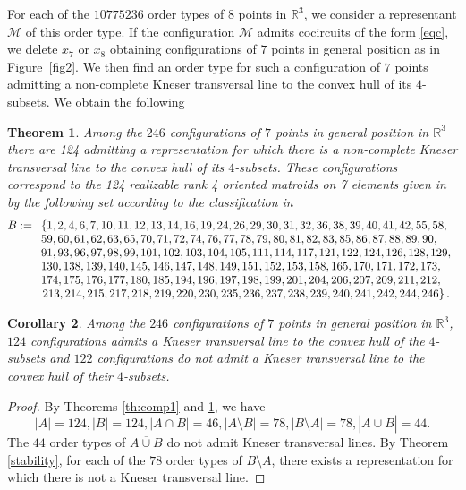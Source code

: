 \documentclass[11pt]{amsart}
\theoremstyle{plain}
\newtheorem{theorem}{Theorem}[section]
\newtheorem{corollary}[theorem]{Corollary}
\theoremstyle{definition}
\theoremstyle{remark}
\begin{document}
For each of the $10775236$ order types of $8$ points in ${\mathbb{R}}^3$, we consider a representant $\mathcal{M}$ of this order type. If the configuration $\mathcal{M}$ admits cocircuits of the form \eqref{eqc}, we delete $x_7$ or $x_8$ obtaining configurations of $7$ points in general position as in Figure~\ref{fig2}. We then find an order type for such a configuration of $7$ points admitting a non-complete Kneser transversal line to the convex hull of its $4$-subsets. We obtain the following

\begin{theorem}\label{th:comp2}
Among the $246$ configurations of $7$ points in general position in ${\mathbb{R}}^3$ there are 124  admitting a representation for which there is a non-complete Kneser transversal line to the convex hull of its $4$-subsets. These configurations correspond to the 124 realizable rank 4 oriented matroids on 7 elements given in by the following set according to the classification in \cite{F}
{\scriptsize $$
B :=
\begin{array}[t]{l}
\left\{1,2,4,6,7,10,11,12,13,14,16,19,24,26,29,30,31,32,36,38,39,40,41,42,55,58,\right.\\
59,60,61,62,63,65,70,71,72,74,76,77,78,79,80,81,82,83,85,86,87,88,89,90,\\
91,93,96,97,98,99,101,102,103,104,105,111,114,117,121,122,124,126,128,129,\\
130,138,139,140,145,146,147,148,149,151,152,153,158,165,170,171,172,173,\\
174,175,176,177,180,185,194,196,197,198,199,201,204,206,207,209,211,212,\\
\left. 213,214,215,217,218,219,220,230,235,236,237,238,239,240,241,242,244,246\right\}.
\end{array}
$$}
\end{theorem}

\begin{corollary}
Among the $246$ configurations of $7$ points in general position in ${\mathbb{R}}^3$, $124$ configurations admits a Kneser transversal line to the convex hull of the $4$-subsets 
and $122$ configurations do not admit a Kneser transversal line to the convex hull of their $4$-subsets.
\end{corollary}

\begin{proof} By Theorems \ref{th:comp1} and \ref{th:comp2}, we have
$$
|A|=124, |B|=124, |A\cap B|=46, |A\setminus B|=78, |B\setminus A|=78, |\overline{A\cup B}|=44.
$$
The $44$ order types of $\overline{A\cup B}$ do not admit Kneser transversal lines. By Theorem \ref{stability}, for each of the $78$ order types of $B\setminus A$, there exists a representation for which there is not a Kneser transversal line.
\end{proof}
\end{document}
